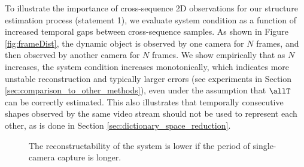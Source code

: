 To illustrate the importance of cross-sequence 2D observations for our structure estimation process (statement 1), we evaluate system condition as a function of increased temporal gaps between cross-sequence samples. As shown in Figure \ref{fig:frameDist}, the dynamic object is observed by one camera for $N$ frames, and then observed by another camera for $N$ frames. We show empirically that as $N$ increases, the system condition increases monotonically, which indicates more unstable reconstruction and typically larger errors (see experiments in Section \ref{sec:comparison_to_other_methods}), even under the assumption that $\allT$ can be correctly estimated. This also illustrates that temporally consecutive shapes observed by the same video stream should not be used to represent each other, as is done in Section \ref{sec:dictionary_space_reduction}.



\begin{figure}
\centering
{}
\caption[System condition given different number of consecutive captures from one camera.]{The reconstructability of the system is lower if the period of single-camera capture is longer.}
\end{figure}

